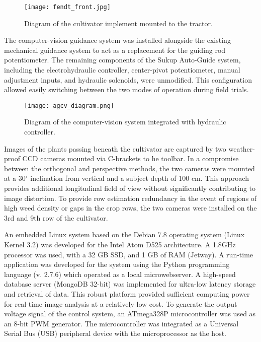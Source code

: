 \begin{figure}
  \centering
  \texttt{[image: fendt\_front.jpg]}
  \caption{Diagram of the cultivator implement mounted to the tractor.}
\end{figure}

The computer-vision guidance system was installed alongside the
existing mechanical guidance system to act as a replacement for the
guiding rod potentiometer. The remaining components of the Sukup
Auto-Guide system, including the electrohydraulic controller,
center-pivot potentiometer, manual adjustment inputs, and hydraulic
solenoids, were unmodified. This configuration allowed easily
switching between the two modes of operation during field trials.

\begin{figure}
  \centering
  \texttt{[image: agcv\_diagram.png]}
  \caption{Diagram of the computer-vision system integrated with hydraulic controller.}
\end{figure}

Images of the plants passing beneath the cultivator are captured by
two weather-proof CCD cameras mounted via C-brackets to he toolbar. 
In a compromise between the orthogonal and perspective
methods, the two cameras were mounted at a 30$^{\circ}$ inclination from
vertical and a subject depth of 100 cm. This approach provides
additional longitudinal field of view without significantly
contributing to image distortion. To provide row estimation redundancy
in the event of regions of high weed density or gaps in the crop rows,
the two cameras were installed on the 3rd and 9th row of the
cultivator.

An embedded Linux system based on the Debian 7.8 operating system
(Linux Kernel 3.2) was developed for the Intel Atom D525
architecture. A 1.8GHz processor was used, with a 32 GB SSD, and 1 GB
of RAM (Jetway). A run-time application was developed for the system
using the Python programming language (v. 2.7.6) which operated as a
local microwebserver. A high-speed database server (MongoDB 32-bit)
was implemented for ultra-low latency storage and retrieval of
data. This robust platform provided sufficient computing power for
real-time image analysis at a relatively low cost. To generate the
output voltage signal of the control system, an
ATmega328P microcontroller was used as an 8-bit PWM generator. The
microcontroller was integrated as a Universal Serial Bus (USB)
peripheral device with the microprocessor as the host. 

